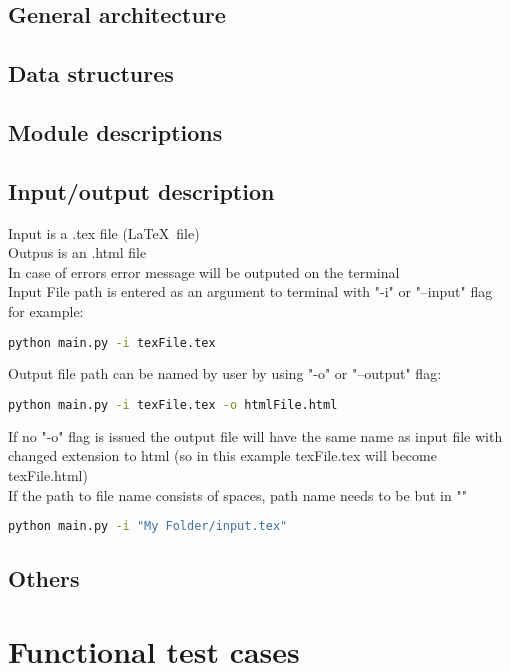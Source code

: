 \documentclass[12pt]{article}
\begin{document}
\subsection{General architecture}

\subsection{Data structures}
\subsection{Module descriptions}
\subsection{Input/output description}
Input is a .tex file (\LaTeX \, file) \\ 
Outpus is an .html file \\ 
In case of errors error message will be outputed on the terminal \\
Input File path is entered as an argument to terminal with "-i" or "--input" flag for example:
\begin{lstlisting}[language=bash]
python main.py -i texFile.tex
\end{lstlisting}
Output file path can be named by user by using "-o" or "--output" flag:
\begin{lstlisting}[language=bash]
python main.py -i texFile.tex -o htmlFile.html
\end{lstlisting}
If no "-o" flag is issued the output file will have the same name as input file with changed extension to html (so in this example texFile.tex will become texFile.html) \\ 
If the path to file name consists of spaces, path name needs to be but in ""
\begin{lstlisting}[language=bash]
python main.py -i "My Folder/input.tex"
\end{lstlisting}
\subsection{Others}
\section{Functional test cases}
\end{document}
